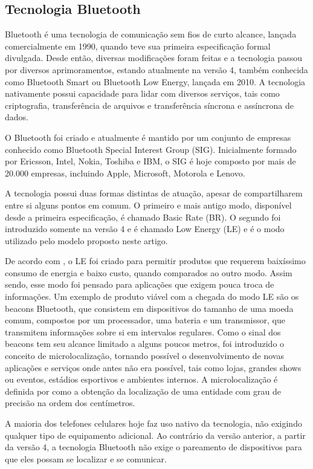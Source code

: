\documentclass[twoside,english,brazilian]{UNISINOSartigo}
\begin{document}
\subsection{Tecnologia Bluetooth}
Bluetooth é uma tecnologia de comunicação sem fios de curto alcance, lançada comercialmente em 1990, quando teve sua primeira especificação formal divulgada. Desde então, diversas modificações foram feitas e a tecnologia passou por diversos aprimoramentos, estando atualmente na versão 4, também conhecida como Bluetooth Smart ou Bluetooth Low Energy, lançada em 2010. A tecnologia nativamente possui capacidade para lidar com diversos serviços, tais como criptografia, transferência de arquivos e transferência síncrona e assíncrona de dados.

O Bluetooth foi criado e atualmente é mantido por um conjunto de empresas conhecido como Bluetooth Special Interest Group (SIG). Inicialmente formado por Ericsson, Intel, Nokia, Toshiba e IBM, o SIG é hoje composto por mais de 20.000 empresas, incluindo Apple, Microsoft, Motorola e Lenovo.

A tecnologia possui duas formas distintas de atuação, apesar de compartilharem entre si alguns pontos em comum. O primeiro e mais antigo modo, disponível desde a primeira especificação, é chamado Basic Rate (BR). O segundo foi introduzido somente na versão 4 e é chamado Low Energy (LE) e é o modo utilizado pelo modelo proposto neste artigo.

De acordo com , o LE foi criado para permitir produtos que requerem baixíssimo consumo de energia e baixo custo, quando comparados ao outro modo. Assim sendo, esse modo foi pensado para aplicações que exigem pouca troca de informações. Um exemplo de produto viável com a chegada do modo LE são os beacons Bluetooth, que consistem em dispositivos do tamanho de uma moeda comum, compostos por um processador, uma bateria e um transmissor, que transmitem informações sobre si em intervalos regulares. Como o sinal dos beacons tem seu alcance limitado a alguns poucos metros, foi introduzido o conceito de microlocalização, tornando possível o desenvolvimento de novas aplicações e serviços onde antes não era possível, tais como lojas, grandes shows ou eventos, estádios esportivos e ambientes internos. A microlocalização é definida por  como a obtenção da localização de uma entidade com grau de precisão na ordem dos centímetros. 

A maioria dos telefones celulares hoje faz uso nativo da tecnologia, não exigindo qualquer tipo de equipamento adicional. Ao contrário da versão anterior, a partir da versão 4, a tecnologia Bluetooth não exige o pareamento de dispositivos para que eles possam se localizar e se comunicar.
\end{document}
